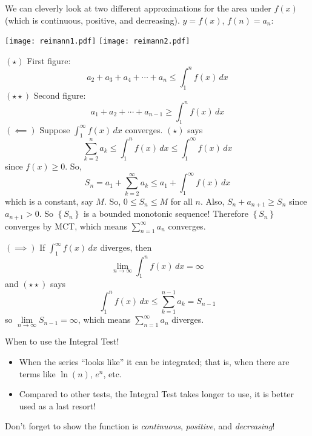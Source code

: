 \begin{Proof}{}{}
    We can cleverly look at two different approximations for the area
    under $ f(x) $ (which is continuous, positive, and decreasing).  $ y=f(x) $,
    $ f(n)=a_n $:
    \begin{center}
        \texttt{[image: reimann1.pdf]}
        \texttt{[image: reimann2.pdf]}
    \end{center}
    $ (\star) $ First figure:
    \[ a_2+a_3+a_4+\cdots+a_n\leqslant \int_{1}^{n} f(x)\, d{x} \]
    $ (\star\star) $ Second figure:
    \[ a_1+a_2+\cdots+a_{n-1}\geqslant \int_{1}^{n} f(x)\, d{x} \]
    $ (\impliedby) $ Suppose $ \int_{1}^{\infty} f(x)\, d{x} $ converges. $ (\star) $
    says
    \[ \sum\limits_{k=2}^{n} a_k\leqslant \int_{1}^{n} f(x)\, d{x}\leqslant
        \int_{1}^{\infty} f(x)\, d{x}  \]
    since $ f(x)\geqslant 0 $. So,
    \[ S_n=a_1+\sum\limits_{k=2}^{\infty} a_k\leqslant a_1+\int_{1}^{\infty} f(x)\, d{x}  \]
    which is a constant, say $ M $. So, $ 0\leqslant S_n\leqslant M $ for all $ n $.
    Also, $ S_{n}+a_{n+1}\geqslant S_n $ since $ a_{n+1}>0 $. So
    $ \left\{ S_n\right\} $ is a bounded monotonic sequence! Therefore
    $ \left\{ S_n\right\} $ converges by MCT, which means $ \sum\limits_{n=1}^{\infty} a_n $
    converges.

    $ (\implies) $ If $ \int_{1}^{\infty} f(x)\, d{x}  $ diverges, then
    \[ \lim\limits_{{n} \to {\infty}} \int_{1}^{n} f(x)\, d{x} =\infty \]
    and $ (\star\star) $ says
    \[ \int_{1}^{n} f(x)\, d{x}\leqslant \sum\limits_{k=1}^{n-1} a_k=S_{n-1} \]
    so $ \lim\limits_{{n} \to {\infty}} S_{n-1}=\infty $, which means
    $ \sum\limits_{n=1}^{\infty} a_n $ diverges.
\end{Proof}

\begin{Remark}{}{}
    When to use the Integral Test!
    \begin{itemize}
        \item When the series ``looks like'' it can be integrated; that is, when there
              are terms like $ \ln(n) $, $ e^n $, etc.
        \item Compared to other tests, the Integral Test takes longer to use, it is better used
              as a last resort!
    \end{itemize}
\end{Remark}

\begin{Remark}{}{}
    Don't forget to show the function is \emph{continuous}, \emph{positive}, and
    \emph{decreasing}!
\end{Remark}

